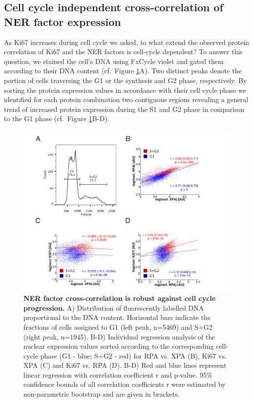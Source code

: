 \subsection {Cell cycle independent cross-correlation of NER factor expression}
As Ki67 increases during cell cycle we asked, to what extend the observed protein correlation of Ki67 and the NER factors is cell-cycle dependent? To answer this question, we stained the cell's DNA using FxCycle violet and gated them according to their DNA content (cf.\ Figure \ref{fig:FC_cell_cycle}A). Two distinct peaks denote the portion of cells traversing the G1 or the synthesis and G2 phase, respectively. By sorting the protein expression values in accordance with their cell cycle phase we identified for each protein combination two contiguous regions revealing a general trend of increased protein expression during the S1 and G2 phase in comparison to the G1 phase (cf.\ Figure \ref{fig:FC_cell_cycle}B-D).  

\begin{figure}[htbp]
	\begin{center}
		\includegraphics[width=1\textwidth]{Abbildungen/figureTAC_4.pdf}
		\caption{\textbf{NER factor cross-correlation is robust against cell cycle progression.} A) Distribution of fluorescently labelled DNA proportional to the DNA content. Horizontal bars indicate the fractions of cells assigned to G1 (left peak, n=5469) and S+G2 (right peak, n=1945).  B-D) Individual regression analysis of the nuclear expression values sorted according to the corresponding cell-cycle phase (G1 - blue; S+G2 - red) for RPA vs. XPA (B), Ki67 vs. XPA (C) and Ki67 vs. RPA (D). B-D) Red and blue lines represent linear regression with correlation coefficient r and p-value. 95\% confidence bounds of all correlation coefficients r were estimated by non-parametric bootstrap and are given in brackets.}
		\label{fig:FC_cell_cycle}
	\end{center}
\end{figure}


